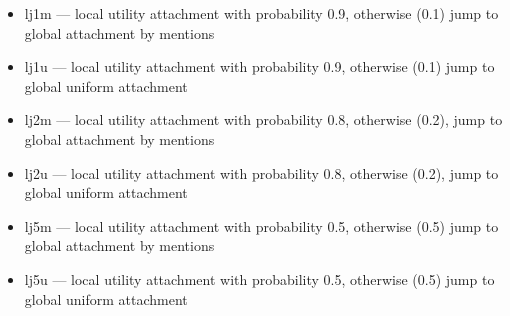 \documentclass[10pt,oneside]{memoir}
\begin{document}
\begin{itemize}


\item lj1m --- local utility attachment with probability 0.9, otherwise (0.1) jump to global attachment by mentions

\item lj1u --- local utility attachment with probability 0.9, otherwise (0.1) jump to global uniform attachment

\item lj2m --- local utility attachment with probability 0.8, otherwise (0.2), jump to global attachment by mentions

\item lj2u --- local utility attachment with probability 0.8, otherwise (0.2), jump to global uniform attachment

\item lj5m --- local utility attachment with probability 0.5, otherwise (0.5) jump to global attachment by mentions

\item lj5u --- local utility attachment with probability 0.5, otherwise (0.5) jump to global uniform attachment
\end{itemize}
\end{document}
